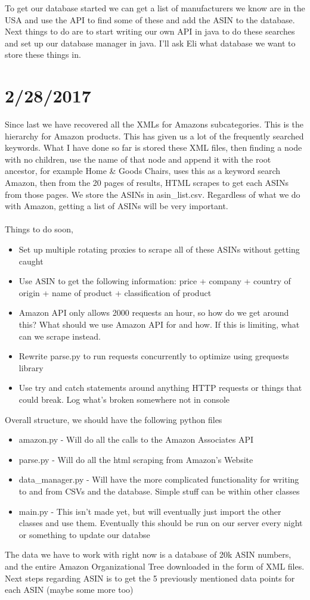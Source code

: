 \documentclass[12pt]{article}
\begin{document}
To get our database started we can get a list of manufacturers we know are in the USA and use the API to find some of these and add the ASIN to the database. Next things to do are to start writing our own API in java to do these searches and set up our database manager in java. I'll ask Eli what database we want to store these things in.

\section*{2/28/2017}
Since last we have recovered all the XMLs for Amazons subcategories. This is the hierarchy for Amazon products. This has given us a lot of the frequently searched keywords. What I have done so far is stored these XML files, then finding a node with no children, use the name of that node and append it with the root ancestor, for example Home \& Goods Chairs, uses this as a keyword search Amazon, then from the 20 pages of results, HTML scrapes to get each ASINs from those pages. We store the ASINs in asin_list.csv. Regardless of what we do with Amazon, getting a list of ASINs will be very important. \\ \\
Things to do soon,

\begin{itemize}
	\item Set up multiple rotating proxies to scrape all of these ASINs without getting caught
	\item Use ASIN to get the following information: price + company + country of origin + name of product + classification of product
	\item Amazon API only allows 2000 requests an hour, so how do we get around this? What should we use Amazon API for and how. If this is limiting, what can we scrape instead.
	\item Rewrite parse.py to run requests concurrently to optimize using grequests library
	\item Use try and catch statements around anything HTTP requests or things that could break. Log what's broken somewhere not in console
\end{itemize}

Overall structure, we should have the following python files

\begin{itemize}
	\item amazon.py - Will do all the calls to the Amazon Associates API
	\item parse.py - Will do all the html scraping from Amazon's Website 
	\item data_manager.py - Will have the more complicated functionality for writing to and from CSVs and the database. Simple stuff can be within other classes
	\item main.py - This isn't made yet, but will eventually just import the other classes and use them. Eventually this should be run on our server every night or something to update our databse
\end{itemize}

The data we have to work with right now is a database of 20k ASIN numbers, and the entire Amazon Organizational Tree downloaded in the form of XML files. Next steps regarding ASIN is to get the 5 previously mentioned data points for each ASIN (maybe some more too)
\end{document}
